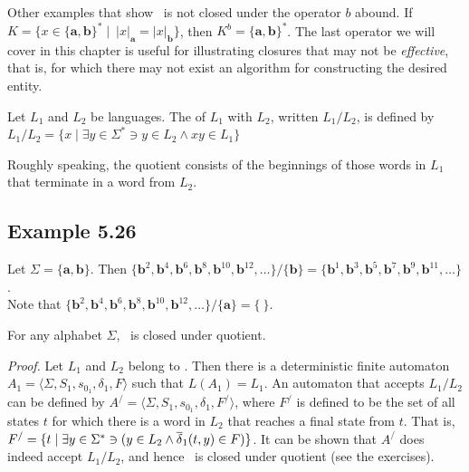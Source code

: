 Other examples that show \NSIG\ is not closed under the operator $b$ abound. If
$K=\{x\in\{\pmb{a},\pmb{b}\}^* \mid \ |x|_{\pmb{a}} = |x|_{\pmb{b}}\}$, then
$K^b=\{\pmb{a},\pmb{b}\}^*$. The last operator we will cover in this chapter is
useful for illustrating closures that may not be \emph{effective}, that is, for which
there may not exist an algorithm for constructing the desired entity.

\begin{dfn}\label{dfn-5.10}
Let $L_1$ and $L_2$ be languages. The \emph{} of $L_1$ with
$L_2$, written $L_1/L_2$, is defined by $L_1/L_2 =\{x \mid \exists y \in \Sigma^* \ni
y \in L_2 \wedge xy \in L_1\}$
\end{dfn}

Roughly speaking, the quotient consists of the beginnings of those words in
$L_1$ that terminate in a word from $L_2$.

\subsection*{Example 5.26}

Let $\Sigma=\{\pmb{a},\pmb{b}\}$. Then $\{\pmb{b}^2,\pmb{b}^4,\pmb{b}^6,\pmb{b}^8,
\pmb{b}^{10},\pmb{b}^{12},\ldots\}/\{\pmb{b}\}=\{\pmb{b}^1,\pmb{b}^3,\pmb{b}^5,
\pmb{b}^7,\pmb{b}^9,\pmb{b}^{11},\ldots\}$.\\Note that %
$\{\pmb{b}^2, \pmb{b}^4, \pmb{b}^6, \pmb{b}^8, \pmb{b}^{10}, \pmb{b}^{12},
\ldots\}/\{\pmb{a}\} = \{\ \}$.

\begin{thm}\label{thm-5.12}
For any alphabet $\Sigma$, \DSIG\ is closed under quotient.

\emph{Proof.} Let $L_1$ and $L_2$ belong to \DSIG. Then there is a
deterministic finite automaton
$A_1=\langle\Sigma,S_1,s_{0_1},\delta_1,F\rangle$ such that $L(A_1)=L_1$. An
automaton that accepts $L_1/L_2$ can be defined by
$A^/=\langle\Sigma,S_1,s_{0_1},\delta_1,F^/\rangle$, where $F^/$ is defined to
be the set of all states $t$ for which there is a word in $L_2$ that reaches a
final state from $t$. That is, $F^/=\{t \mid \exists y \in \Sigma^*\ni (y \in L_2
\wedge \overline{\delta}_1(t,y) \in F)\}$. It can be shown that $A^/$ does indeed accept
$L_1/L_2$, and hence \DSIG\ is closed under quotient (see the exercises).
\end{thm}

